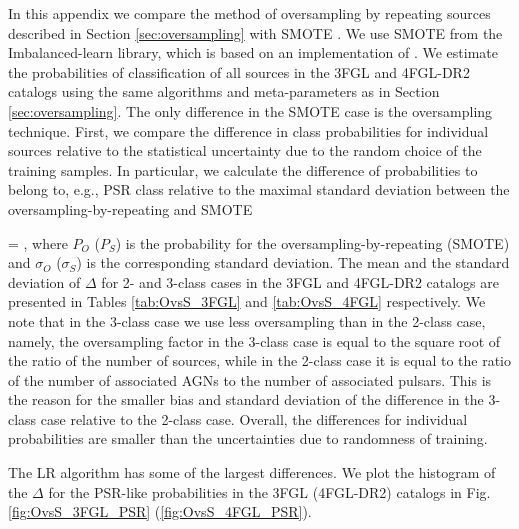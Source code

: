 In this appendix we compare the method of oversampling by repeating sources described in Section \ref{sec:oversampling} 
with SMOTE \citep{2011arXiv1106.1813C}. We use SMOTE from the Imbalanced-learn library, which is based on an implementation of \citet{Chawla_2002}. 
We estimate the probabilities of classification of all sources in the 3FGL and 4FGL-DR2 catalogs using the same algorithms and meta-parameters as in Section \ref{sec:oversampling}.
The only difference in the SMOTE case is the oversampling technique.
First, we compare the difference in class probabilities for individual sources relative to the statistical uncertainty due to the random choice of the training samples.
In particular, we calculate the difference of probabilities to belong to, e.g., PSR class relative to the maximal standard deviation
between the oversampling-by-repeating and SMOTE

\be
{}
\Delta = ,
\ee
where $P_O$ ($P_S$) is the probability for the oversampling-by-repeating (SMOTE) and $\sigma_O$ ($\sigma_S$) is the corresponding standard deviation. 
The mean and the standard deviation of $\Delta$ for 2- and 3-class cases in the 3FGL and 4FGL-DR2 catalogs are presented in 
Tables \ref{tab:OvsS_3FGL} and \ref{tab:OvsS_4FGL} respectively.
We note that in the 3-class case we use less oversampling than in the 2-class case, namely, the oversampling factor in the 3-class case is equal to the square root of the ratio of the number of sources, while in the 2-class case it is equal to the ratio of the number of associated AGNs to the number of associated pulsars.
This is the reason for the smaller bias and standard deviation of the difference in the 3-class case relative to the 2-class case.
Overall, the differences for individual probabilities are smaller than the uncertainties due to randomness of training.


The LR algorithm has some of the largest differences.
We plot the histogram of the $\Delta$ for the PSR-like probabilities in the 3FGL (4FGL-DR2) catalogs in Fig. \ref{fig:OvsS_3FGL_PSR}
(\ref{fig:OvsS_4FGL_PSR}).

